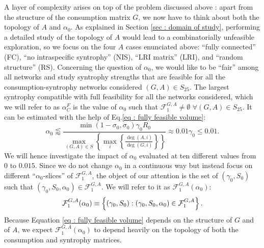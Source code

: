 \documentclass[12pt, titlepage]{report}
\begin{document}
A layer of complexity arises on top of the problem discussed above%
: apart from the structure of the consumption matrix $G$, we now have to think about both the topology of $A$ and $\alpha_0$. As explained in Section \ref{sec : domain of study}, performing a detailed study of the topology of $A$ would lead to a combinatorially unfeasible exploration, so we focus on the four $A$ cases enunciated above: ``fully connected'' (FC), ``no intraspecific syntrophy'' (NIS), ``LRI matrix'' (LRI), and ``random structure'' (RS). Concerning the question of $\alpha_0$, we would like to be ``fair'' among all networks and study syntrophy strengths that are feasible for all the consumption-syntrophy networks considered $(G,A) \in S_{25}$.
  The largest syntrophy compatible with full feasibility for all the networks considered, which we will refer to as  $\alpha_C^F$ is the value of $\alpha_0$ such that $\mathcal{F}^{G,A}_1 \neq \emptyset $ $\forall (G,A) \in S_{25}$. It can be estimated with the help of Eq.\eqref{eq : fully feasible volume}:
  \begin{equation}
  \alpha_0 \lessapprox \frac{\min(1-\sigma_0, \sigma_0)\gamma_0 R_0}{\max_{(G,A)\in S}\left\{\max_i\left\{\frac{\deg(A,i)}{\deg(G,i)}\right\}\right\}} \approx 0.01 \gamma_0 \leq 0.01. \label{eq : results feasibility largest alpha0}
  \end{equation}
  We will hence investigate the impact of $\alpha_0$ evaluated at ten different values from $0$ to $0.015$. %
  Since we do not change $\alpha_0$ in a continuous way but instead focus on different ``$\alpha_0$-slices'' of $\mathcal{F}^{G,A}_1$, the object of our attention is the set of $(\gamma_0, S_0)$ such that $(\gamma_0, S_0, \alpha_0) \in \mathcal{F}^{G,A}_1$. We will refer to it as $\mathcal{F}^{G,A}_1(\alpha_0)$:
  \begin{equation}
  \mathcal{F}^{G,A}_1(\alpha_0) \equiv \left\{(\gamma_0, S_0) : (\gamma_0, S_0, \alpha_0) \in \mathcal{F}^{G,A}_1 \right\}.
  \end{equation}
  Because Equation \eqref{eq : fully feasible volume} depends on the structure of $G$ and of $A$, we expect $\mathcal{F}^{G,A}_1(\alpha_0)$ to depend heavily on the topology of both the consumption and syntrophy matrices.
\end{document}
